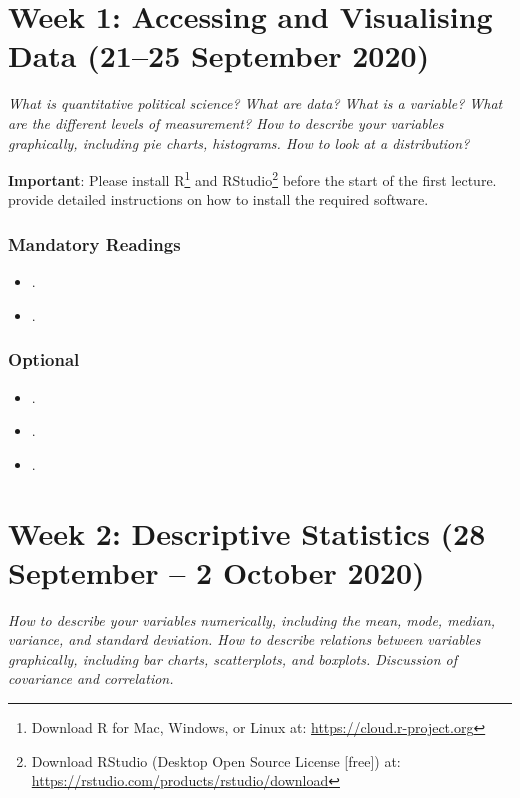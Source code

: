 \documentclass[abstract=on,parskip=full,headings=standardclasses,fontsize=11pt,paper=a4]{scrartcl}
\begin{document}
\section{Week 1: Accessing and Visualising Data (21--25 September 2020)}


\textit{What is quantitative political science? What are data? What is a variable? What are the different levels of measurement? How to describe your variables graphically, including pie charts, histograms. How to look at a distribution?}

\textbf{Important}: Please install \textsf{R}\footnote{Download \textsf{R} for Mac, Windows, or Linux at: \url{https://cloud.r-project.org}} and \textsf{RStudio}\footnote{Download \textsf{RStudio} (Desktop Open Source License [free]) at: \url{https://rstudio.com/products/rstudio/download}} before the start of the first lecture.  \textcite[ch. 1]{ismay20} provide detailed instructions on how to install the required software.


\subsubsection*{Mandatory Readings}
\begin{itemize}
\item {}.
\item {}.
\end{itemize}

\subsubsection*{Optional}
\begin{itemize}
\item {}.
\item {}.
\item {}.
\end{itemize}

\section{Week 2: Descriptive Statistics (28 September -- 2 October 2020)}

\textit{How to describe your variables numerically, including the mean, mode, median, variance, and standard deviation. How to describe relations between variables graphically, including bar charts, scatterplots, and boxplots. Discussion of covariance and correlation.}
\end{document}
